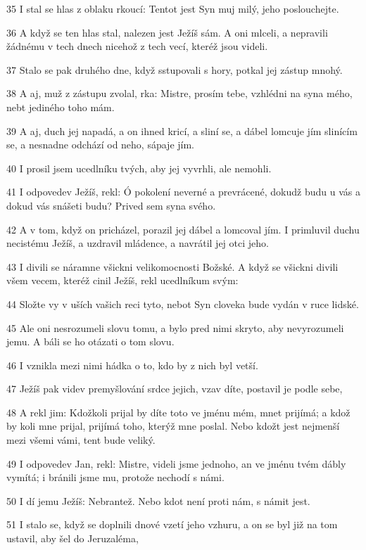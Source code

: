 \par 35 I stal se hlas z oblaku rkoucí: Tentot jest Syn muj milý, jeho poslouchejte.
\par 36 A když se ten hlas stal, nalezen jest Ježíš sám. A oni mlceli, a nepravili žádnému v tech dnech nicehož z tech vecí, kteréž jsou videli.
\par 37 Stalo se pak druhého dne, když sstupovali s hory, potkal jej zástup mnohý.
\par 38 A aj, muž z zástupu zvolal, rka: Mistre, prosím tebe, vzhlédni na syna mého, nebt jediného toho mám.
\par 39 A aj, duch jej napadá, a on ihned kricí, a sliní se, a dábel lomcuje jím slinícím se, a nesnadne odchází od neho, sápaje jím.
\par 40 I prosil jsem ucedlníku tvých, aby jej vyvrhli, ale nemohli.
\par 41 I odpovedev Ježíš, rekl: Ó pokolení neverné a prevrácené, dokudž budu u vás a dokud vás snášeti budu? Prived sem syna svého.
\par 42 A v tom, když on pricházel, porazil jej dábel a lomcoval jím. I primluvil duchu necistému Ježíš, a uzdravil mládence, a navrátil jej otci jeho.
\par 43 I divili se náramne všickni velikomocnosti Božské. A když se všickni divili všem vecem, kteréž cinil Ježíš, rekl ucedlníkum svým:
\par 44 Složte vy v uších vašich reci tyto, nebot Syn cloveka bude vydán v ruce lidské.
\par 45 Ale oni nesrozumeli slovu tomu, a bylo pred nimi skryto, aby nevyrozumeli jemu. A báli se ho otázati o tom slovu.
\par 46 I vznikla mezi nimi hádka o to, kdo by z nich byl vetší.
\par 47 Ježíš pak videv premyšlování srdce jejich, vzav díte, postavil je podle sebe,
\par 48 A rekl jim: Kdožkoli prijal by díte toto ve jménu mém, mnet prijímá; a kdož by koli mne prijal, prijímá toho, kterýž mne poslal. Nebo kdožt jest nejmenší mezi všemi vámi, tent bude veliký.
\par 49 I odpovedev Jan, rekl: Mistre, videli jsme jednoho, an ve jménu tvém dábly vymítá; i bránili jsme mu, protože nechodí s námi.
\par 50 I dí jemu Ježíš: Nebrantež. Nebo kdot není proti nám, s námit jest.
\par 51 I stalo se, když se doplnili dnové vzetí jeho vzhuru, a on se byl již na tom ustavil, aby šel do Jeruzaléma,
